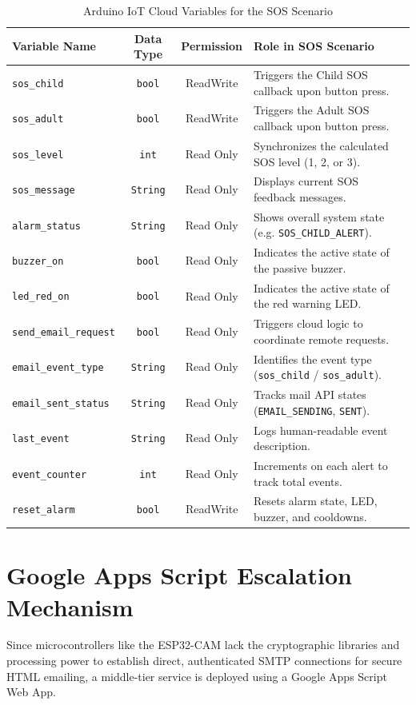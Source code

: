 \documentclass[conference]{IEEEtran}
\begin{document}
\begin{table}[!t]
\centering
\caption{Arduino IoT Cloud Variables for the SOS Scenario}
\label{tab:variables}
\scriptsize
\renewcommand{\arraystretch}{1.2}
\begin{tabularx}{\columnwidth}{l|c|c|X}
\toprule
\textbf{Variable Name} & \textbf{Data Type} & \textbf{Permission} & \textbf{Role in SOS Scenario} \\
\midrule
\texttt{sos\_child} & \texttt{bool} & ReadWrite & Triggers the Child SOS callback upon button press. \\
\texttt{sos\_adult} & \texttt{bool} & ReadWrite & Triggers the Adult SOS callback upon button press. \\
\texttt{sos\_level} & \texttt{int} & Read Only & Synchronizes the calculated SOS level (1, 2, or 3). \\
\texttt{sos\_message} & \texttt{String} & Read Only & Displays current SOS feedback messages. \\
\texttt{alarm\_status} & \texttt{String} & Read Only & Shows overall system state (e.g. \texttt{SOS\_CHILD\_ALERT}). \\
\texttt{buzzer\_on} & \texttt{bool} & Read Only & Indicates the active state of the passive buzzer. \\
\texttt{led\_red\_on} & \texttt{bool} & Read Only & Indicates the active state of the red warning LED. \\
\texttt{send\_email\_request} & \texttt{bool} & Read Only & Triggers cloud logic to coordinate remote requests. \\
\texttt{email\_event\_type} & \texttt{String} & Read Only & Identifies the event type (\texttt{sos\_child} / \texttt{sos\_adult}). \\
\texttt{email\_sent\_status} & \texttt{String} & Read Only & Tracks mail API states (\texttt{EMAIL\_SENDING}, \texttt{SENT}). \\
\texttt{last\_event} & \texttt{String} & Read Only & Logs human-readable event description. \\
\texttt{event\_counter} & \texttt{int} & Read Only & Increments on each alert to track total events. \\
\texttt{reset\_alarm} & \texttt{bool} & ReadWrite & Resets alarm state, LED, buzzer, and cooldowns. \\
\bottomrule
\end{tabularx}
\end{table}

\section{Google Apps Script Escalation Mechanism}
Since microcontrollers like the ESP32-CAM lack the cryptographic libraries and processing power to establish direct, authenticated SMTP connections for secure HTML emailing, a middle-tier service is deployed using a Google Apps Script Web App. 
\end{document}
